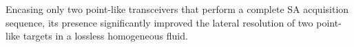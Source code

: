 Encasing only two point-like transceivers that perform
a complete \ac{SA} acquisition sequence,
its presence significantly improved
the lateral resolution of
two point-like targets in
a lossless homogeneous fluid.
